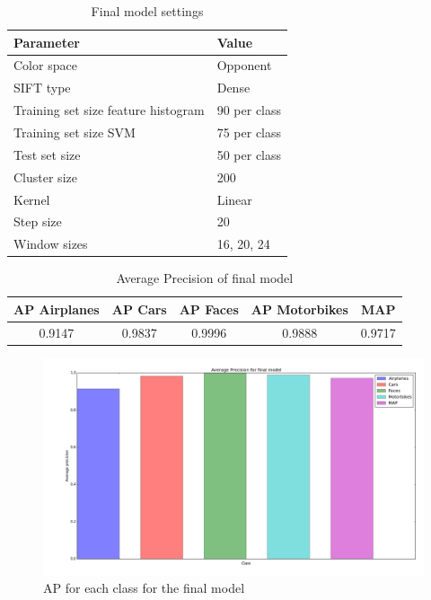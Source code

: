 \begin{table}[H]
\begin{tabular}{|l|l|}
\hline
\textbf{Parameter} & \textbf{Value}\\
\hline
Color space & Opponent\\
SIFT type & Dense\\
Training set size feature histogram & 90 per class\\
Training set size SVM & 75 per class\\
Test set size & 50 per class \\
Cluster size & 200 \\
Kernel & Linear \\
Step size & 20\\
Window sizes & 16, 20, 24\\
\hline
\end{tabular}
\caption{Final model settings}
\label{tab:final}
\end{table}

\begin{table}[H]
\begin{tabular}{|ccccc|}
\hline
\textbf{AP Airplanes} & \textbf{AP Cars} & \textbf{AP Faces} & \textbf{AP Motorbikes} & \textbf{MAP}\\
\hline
0.9147 & 0.9837 & 0.9996 & 0.9888 & 0.9717\\
\hline
\end{tabular}
\caption{Average Precision of final model}
\label{tab:results_final}
\end{table}

\begin{figure}[H]
\includegraphics[width=\textwidth]{../plots/final_model}
\caption{AP for each class for the final model}
\label{plot:final}
\end{figure}